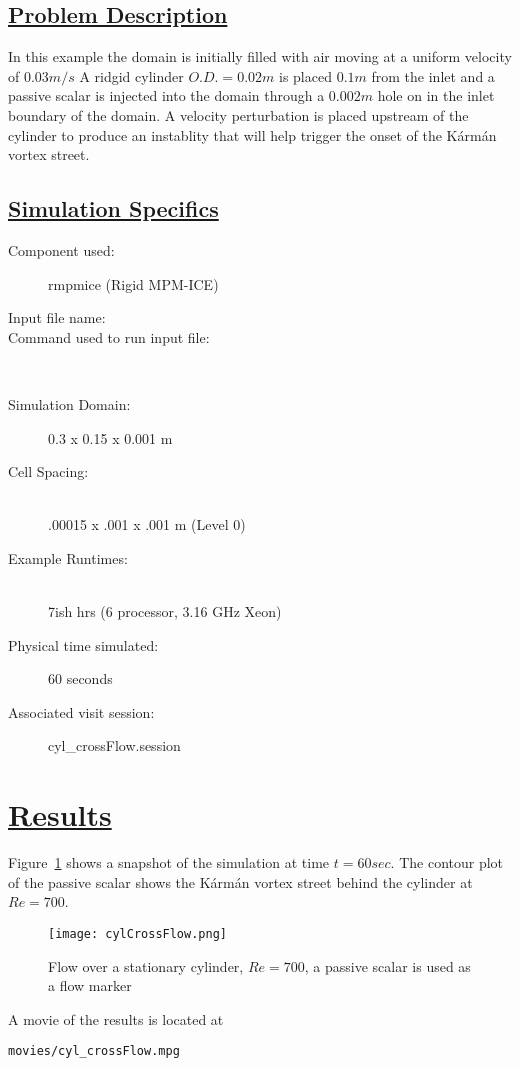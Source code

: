 \subsection*{\underline{Problem Description}}
In this example the domain is initially filled with air moving at a uniform velocity of $0.03m/s$  A ridgid cylinder $O.D. = 0.02m$ is placed $0.1m$ from the inlet and a passive scalar is injected into the domain through a $0.002m$ hole on in the inlet boundary of the domain.  A velocity perturbation is placed upstream of the cylinder to produce an instablity that will help trigger the onset of the K\'arm\'an vortex street.
%
\subsection*{\underline{Simulation Specifics}}
\begin{description}
\item [Component used:] \hfill rmpmice (Rigid MPM-ICE)
\item [Input file name:] \hfill {}
\item [Command used to run input file:]\hfill \\

\item [Simulation Domain:]\hfill    0.3 x 0.15 x 0.001 m

\item [Cell Spacing:]\hfill \\
.00015 x .001 x .001 m (Level 0)

\item [Example Runtimes:] \hfill \\
 7ish hrs   (6 processor, 3.16 GHz Xeon)\\

\item [Physical time simulated:] \hfill 60 seconds

\item [Associated visit session:] \hfill cyl\_crossFlow.session

\end{description}

\section*{\underline{Results}}

Figure~\ref{fig:cylCrossFlow} shows a snapshot of the simulation at time $t=60sec$.  The contour
plot of the passive scalar shows the K\'arm\'an vortex street behind the cylinder at $Re=700$.
\begin{figure}
  \center
  \texttt{[image: cylCrossFlow.png]}
  \caption{Flow over a stationary cylinder, $Re=700$, a passive scalar is used as a flow marker}
  \label{fig:cylCrossFlow}
\end{figure}
%
A movie of the results is located at
\begin{Verbatim}[fontsize=\footnotesize]
  movies/cyl_crossFlow.mpg
\end{Verbatim}
\newpage

